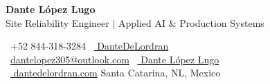 \begin{center}
    \textbf{\huge Dante López Lugo} \\ \vspace{2pt}
    {\small Site Reliability Engineer $\vert$ Applied AI \& Production Systems} \\ \vspace{2pt}
\end{center}
    {\raisebox{0.2\height}{\footnotesize \faPhone}\ +52 844-318-3284}
    \hfill {\raisebox{0.1\height}{\footnotesize \faGithub}\ \href{https://github.com/DanteDeLordran/}{ DanteDeLordran}} \\
    {\raisebox{0.0\height}{\footnotesize \faEnvelope}\ \href{mailto:dantelopez305@outlook.com}{dantelopez305@outlook.com}} \hfill
    {\raisebox{0.1\height}{\footnotesize \faLinkedin}\ \href{http://www.linkedin.com/in/dantelopezlugo}{ Dante López Lugo }} \\
    {\raisebox{0.1\height}{\footnotesize \faGlobe}\ \href{https://dantedelordran.com}{ dantedelordran.com}}
    \hfill Santa Catarina, NL, Mexico
